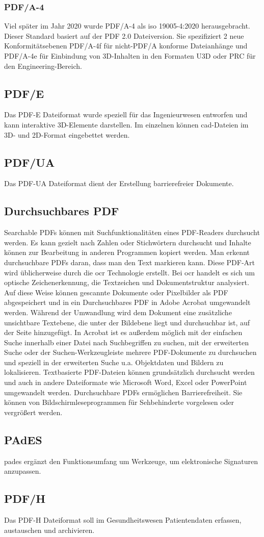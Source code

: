 \subsubsection{PDF/A-4}
Viel später im Jahr 2020 wurde PDF/A-4 als \gls{iso} 19005-4:2020 herausgebracht. Dieser Standard basiert auf der PDF 2.0 Dateiversion. Sie spezifiziert 2 neue Konformitätsebenen PDF/A-4f für nicht-PDF/A konforme Dateianhänge und PDF/A-4e für Einbindung von 3D-Inhalten in den Formaten U3D oder PRC für den Engineering-Bereich. \cite{proj-consult}


\subsection{PDF/E}
Das PDF-E Dateiformat wurde speziell für das Ingenieurwesen entworfen und kann interaktive 3D-Elemente darstellen. Im einzelnen können \gls{cad}-Dateien im 3D- und 2D-Format eingebettet werden.


\subsection{PDF/UA}
Das PDF-UA Dateiformat dient der Erstellung barrierefreier Dokumente.


\subsection{Durchsuchbares PDF}
Searchable PDFs können mit Suchfunktionalitäten eines PDF-Readers durchsucht werden. Es kann gezielt nach Zahlen oder Stichwörtern durchsucht und Inhalte können zur Bearbeitung in anderen Programmen kopiert werden. Man erkennt durchsuchbare PDFs daran, dass man den Text markieren kann. Diese PDF-Art wird üblicherweise durch die \gls{ocr} Technologie erstellt. Bei \gls{ocr} handelt es sich um optische Zeichenerkennung, die Textzeichen und Dokumentstruktur analysiert. Auf diese Weise können gescannte Dokumente oder Pixelbilder als PDF abgespeichert und in ein Durchsuchbares PDF in Adobe Acrobat umgewandelt werden. Während der Umwandlung wird dem Dokument eine zusätzliche unsichtbare Textebene, die unter der Bildebene liegt und durchsuchbar ist, auf der Seite hinzugefügt. In Acrobat ist es außerdem möglich mit der einfachen Suche innerhalb einer Datei nach Suchbegriffen zu suchen, mit der erweiterten Suche oder der Suchen-Werkzeugleiste mehrere PDF-Dokumente zu durchsuchen und speziell in der erweiterten Suche u.a. Objektdaten und Bildern zu lokalisieren. Textbasierte PDF-Dateien können grundsätzlich durchsucht werden und auch in andere Dateiformate wie Microsoft Word, Excel oder PowerPoint umgewandelt werden. Durchsuchbare PDFs ermöglichen Barrierefreiheit. Sie können von Bildschirmleseprogrammen für Sehbehinderte vorgelesen oder vergrößert werden. 
\cite{adobe-search}


\subsection{PAdES}
\gls{pades} ergänzt den Funktionsumfang um Werkzeuge, um elektronische Signaturen anzupassen.


\subsection{PDF/H}
Das PDF-H Dateiformat soll im Gesundheitswesen Patientendaten erfassen, austauschen und archivieren.
